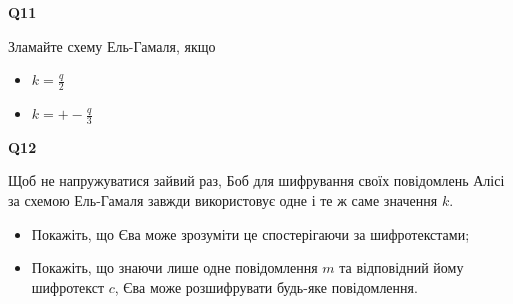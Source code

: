 \documentclass{../../test-template}
\begin{document}
\begin{tcolorbox}[lowerbox=invisible,colback=white]
    \begin{minipage}{0.1\textwidth}
        \raggedright
        \vspace*{\fill}
            \textbf{Q11}
        \vspace*{\fill}
        \end{minipage}
        \begin{minipage}{0.75\textwidth}
          Зламайте схему Ель-Гамаля, якщо 
          \begin{itemize}
            \item $k=\frac{q}{2}$
            \item $k=+-\frac{q}{3}$
        \end{itemize}
        \end{minipage}
\end{tcolorbox}


\begin{tcolorbox}[lowerbox=invisible,colback=white]
    \begin{minipage}{0.1\textwidth}
        \raggedright
        \vspace*{\fill}
            \textbf{Q12}
        \vspace*{\fill}
        \end{minipage}
        \begin{minipage}{0.75\textwidth}
          Щоб не напружуватися зайвий раз, Боб для шифрування своїх повідомлень Алісі за схемою Ель-Гамаля завжди використовує одне і те ж саме значення $k$. 
    \begin{itemize}
    \item Покажіть, що Єва може зрозуміти це спостерігаючи за шифротекстами;
    \item Покажіть, що знаючи лише одне повідомлення $m$ та відповідний йому шифротекст $c$, Єва може розшифрувати будь-яке повідомлення.
    \end{itemize}
        \end{minipage}
\end{tcolorbox}
\end{document}
